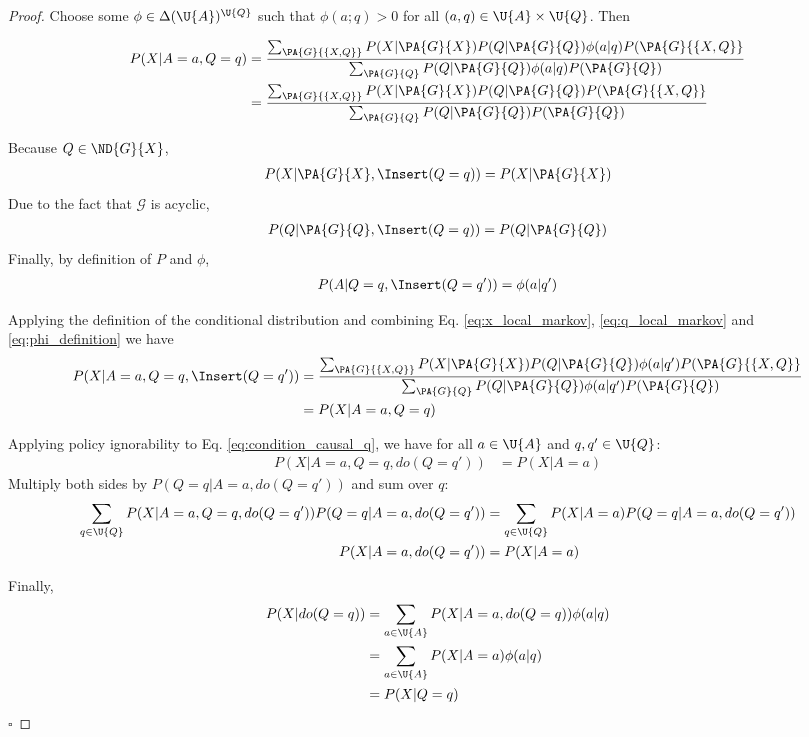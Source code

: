 \begin{proof}
Choose some $\phi\in \Delta(\U{A})^{\U{Q}}$ such that $\phi(a;q)>0$ for all $(a,q)\in\U{A}\times\U{Q}$. Then

\begin{align}
    P(X|A=a,Q=q) &= \frac{\sum_{\PA{G}{\{X,Q\}}} P(X|\PA{G}{X}) P(Q|\PA{G}{Q}) \phi(a|q) P(\PA{G}{\{X,Q\}}}{\sum_{\PA{G}{Q}}P(Q|\PA{G}{Q})\phi(a|q) P(\PA{G}{Q})}\\
                 &= \frac{\sum_{\PA{G}{\{X,Q\}}} P(X|\PA{G}{X}) P(Q|\PA{G}{Q}) P(\PA{G}{\{X,Q\}}}{\sum_{\PA{G}{Q}}P(Q|\PA{G}{Q}) P(\PA{G}{Q})}\\
\end{align}

Because $Q\in \ND{G}{X}$, 
\begin{align}
    P(X|\PA{G}{X},\Insert(Q=q))=P(X|\PA{G}{X}) \label{eq:x_local_markov}
\end{align}
Due to the fact that $\mathcal{G}$ is acyclic, 
\begin{align}
    P(Q|\PA{G}{Q},\Insert(Q=q))=P(Q|\PA{G}{Q}) \label{eq:q_local_markov}
\end{align}
Finally, by definition of $P$ and $\phi$,
\begin{align}
    P(A|Q=q,\Insert(Q=q'))=\phi(a|q') \label{eq:phi_definition}
\end{align}

Applying the definition of the conditional distribution and combining Eq. \ref{eq:x_local_markov}, \ref{eq:q_local_markov} and \ref{eq:phi_definition} we have
\begin{align}
   P(X|A=a,Q=q,\Insert(Q=q')) &= \frac{\sum_{\PA{G}{\{X,Q\}}} P(X|\PA{G}{X}) P(Q|\PA{G}{Q}) \phi(a|q') P(\PA{G}{\{X,Q\}}}{\sum_{\PA{G}{Q}}P(Q|\PA{G}{Q})\phi(a|q') P(\PA{G}{Q})}\\ 
                         &= P(X|A=a, Q=q) \label{eq:condition_causal_q}
\end{align}

Applying policy ignorability to Eq. \ref{eq:condition_causal_q}, we have for all $a\in\U{A}$ and $q,q'\in\U{Q}$:
\begin{align}
    P(X|A=a,Q=q,do(Q=q')) &= P(X|A=a)
\end{align}
Multiply both sides by $P(Q=q|A=a,do(Q=q'))$ and sum over $q$:
\begin{align}
    \sum_{q\in\U{Q}} P(X|A=a,Q=q,do(Q=q'))P(Q=q|A=a,do(Q=q')) &= \sum_{q\in \U{Q}} P(X|A=a)P(Q=q|A=a,do(Q=q'))\\
    P(X|A=a,do(Q=q')) &= P(X|A=a)
\end{align}

Finally,
\begin{align}
    P(X|do(Q=q)) &= \sum_{a\in\U{A}} P(X|A=a,do(Q=q)) \phi(a|q) \\
                 &= \sum_{a\in\U{A}} P(X|A=a)\phi(a|q) \\
                 &= P(X|Q=q)
\end{align}
$\square$
\end{proof}


